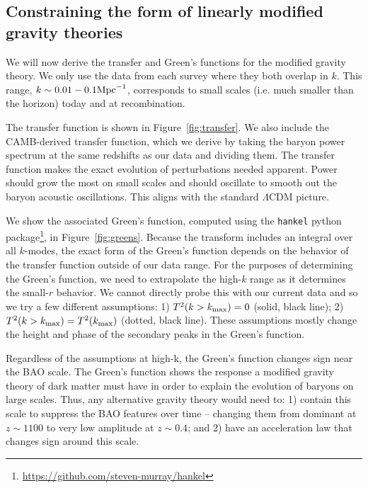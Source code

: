 \documentclass[12pt,floats,floatfix,showpacs,amssymb,amsmath,prl,superscriptaddress,nofootinbib, aps]{revtex4-2}
\begin{document}
\subsection{Constraining the form of linearly modified gravity theories}
We will now derive the transfer and Green's functions for the modified gravity theory. We only use the data from each survey where they both overlap in $k$.  This range, $k\sim0.01 - 0.1\rm{Mpc}^{-1}$, corresponds to small scales (i.e. much smaller than the horizon) today and at recombination.

The transfer function is shown in Figure~\ref{fig:transfer}. We also include the CAMB-derived transfer function, which we derive by taking the baryon power spectrum at the same redshifts as our data and dividing them. The transfer function makes the exact evolution of perturbations needed apparent. Power should grow the most on small scales and should oscillate to smooth out the baryon acoustic oscillations. This aligns with the standard $\Lambda$CDM picture.

We show the associated Green's function, computed using the \texttt{hankel} python package\footnote{\url{https://github.com/steven-murray/hankel}}, in Figure~\ref{fig:greens}. Because the transform includes an integral over all $k$-modes, the exact form of the Green's function depends on the behavior of the transfer function outside of our data range. For the purposes of determining the Green's function, we need to extrapolate the high-$k$ range as it determines the small-$r$ behavior. We cannot directly probe this with our current data and so we try a few different assumptions: 1) $T^2(k>k_{\rm{max}}) = 0$ (solid, black line); 2) $T^2(k>k_{\rm{max}}) = T^2(k_{\rm{max}})$ (dotted, black line). These assumptions mostly change the height and phase of the secondary peaks in the Green's function.

Regardless of the assumptions at high-k, the Green's function changes sign near the BAO scale. The Green's function shows the response a modified gravity theory of dark matter must have in order to explain the evolution of baryons on large scales. Thus, any alternative gravity theory would need to: 1) contain this scale to suppress the BAO features over time -- changing them from dominant at $z\sim 1100$ to very low amplitude at $z\sim 0.4$; and 2) have an acceleration law that changes sign around this scale.
\end{document}

